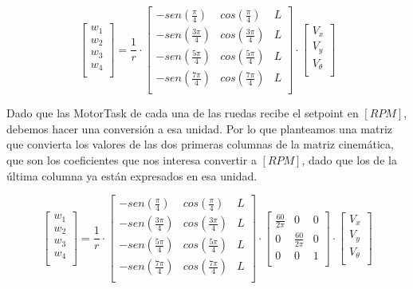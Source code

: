 $$ \begin{bmatrix} w_1 \\ w_2 \\ w_3 \\ w_4 \\ \end{bmatrix} = \frac{1}{r} \cdot \begin{bmatrix}
    {-sen(\frac{\pi}{4})} & {cos( \frac{\pi}{4})} & L \\
    {-sen(\frac{3\pi}{4})} & {cos(\frac{3\pi}{4})} & L \\
    {-sen(\frac{5\pi}{4})} & {cos(\frac{5\pi}{4})} & L \\
    {-sen(\frac{7\pi}{4})} & {cos(\frac{7\pi}{4})} & L \\
\end{bmatrix} \cdot
\begin{bmatrix} V_x \\ V_y \\ V_\theta \\ \end{bmatrix} $$

Dado que las MotorTask de cada una de las ruedas recibe el setpoint en $[RPM]$, debemos hacer una conversión a esa unidad. Por lo que planteamos una matriz que convierta los valores de las dos primeras columnas de la matriz cinemática, que son los coeficientes que nos interesa convertir a $[RPM]$, dado que los de la última columna ya están expresados en esa unidad.

$$ \begin{bmatrix} w_1 \\ w_2 \\ w_3 \\ w_4 \\ \end{bmatrix} =
    \frac{1}{r}
    \cdot
    \begin{bmatrix}
        {-sen(\frac{\pi}{4})} & {cos( \frac{\pi}{4})} & L \\
        {-sen(\frac{3\pi}{4})} & {cos(\frac{3\pi}{4})} & L \\
        {-sen(\frac{5\pi}{4})} & {cos(\frac{5\pi}{4})} & L \\
        {-sen(\frac{7\pi}{4})} & {cos(\frac{7\pi}{4})} & L \\
    \end{bmatrix}
    \cdot
    \begin{bmatrix}
        {\frac{60}{2 \pi}} & {0} & {0} \\
        {0} & {\frac{60}{2 \pi}} & {0} \\
        {0} & {0} & {1}                \\
    \end{bmatrix}
    \cdot
    \begin{bmatrix} V_x \\ V_y \\ V_\theta \\ \end{bmatrix} $$


